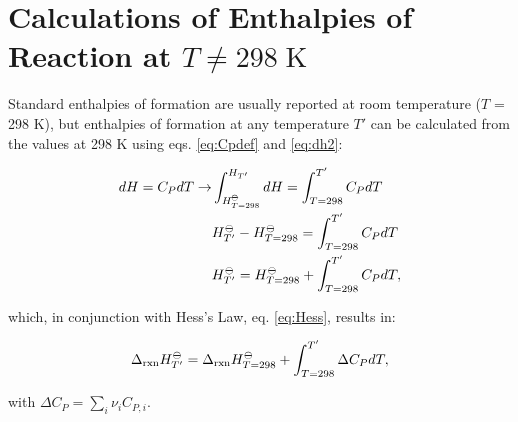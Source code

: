\documentclass[
  9pt,
]{extbook}
\theoremstyle{definition}
\theoremstyle{definition}
\theoremstyle{definition}
\theoremstyle{definition}
\theoremstyle{remark}
\begin{document}
\section{\texorpdfstring{Calculations of Enthalpies of Reaction at \(T \neq 298 \; \text{K}\)}{Calculations of Enthalpies of Reaction at T \textbackslash neq 298 \textbackslash; \textbackslash text\{K\}}}\label{calculations-of-enthalpies-of-reaction-at-t-neq-298-textk}

Standard enthalpies of formation are usually reported at room temperature (\(T\) = 298 K), but enthalpies of formation at any temperature \(T'\) can be calculated from the values at 298 K using eqs. \eqref{eq:Cpdef} and \eqref{eq:dh2}:

\begin{equation}
\begin{aligned}
dH = C_P dT \rightarrow & \int_{H_{T=298}^{-\kern-6pt{\ominus}\kern-6pt-}}^{H_{T'}} dH =  \int_{T=298}^{T'} C_P dT \\
            & H_{T'}^{-\kern-6pt{\ominus}\kern-6pt-}- H_{T=298}^{-\kern-6pt{\ominus}\kern-6pt-}= \int_{T=298}^{T'} C_P dT \\
            & H_{T'}^{-\kern-6pt{\ominus}\kern-6pt-}= H_{T=298}^{-\kern-6pt{\ominus}\kern-6pt-}+ \int_{T=298}^{T'} C_P dT,
\end{aligned}
  \label{eq:DrxnHneq298}
\end{equation}

which, in conjunction with Hess's Law, eq. \eqref{eq:Hess}, results in:

\begin{equation}
 \Delta_{\text{rxn}} H_{T'}^{-\kern-6pt{\ominus}\kern-6pt-}= \Delta_{\text{rxn}} H_{T=298}^{-\kern-6pt{\ominus}\kern-6pt-}+ \int_{T=298}^{T'} \Delta C_P dT,
  \label{eq:DrxnHneq298f}
\end{equation}

with \(\Delta C_P = \sum_i \nu_i C_{P,i}\).
\end{document}
